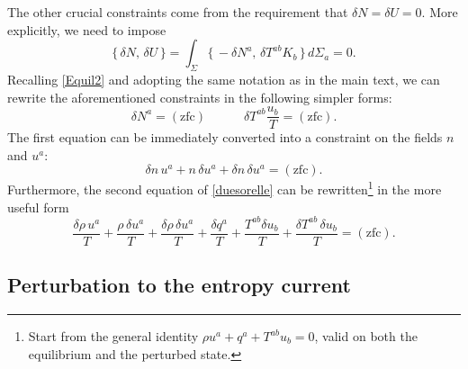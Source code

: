 \documentclass[a4paper, amsfonts, amssymb, amsmath, reprint, showkeys, nofootinbib, twoside, onecolumn,notitlepage]{revtex4-1}
\newcommand{\spc}{\quad \quad \quad}
\begin{document}
The other crucial constraints come from the requirement that $\delta N=\delta U=0$. More explicitly, we need to impose
\begin{equation}
\{ \, \delta N , \,  \delta U \, \} = \int_\Sigma \{ \, -\delta N^a, \, \delta T^{ab} K_b \, \} \, d\Sigma_a =0.
\end{equation}
Recalling \eqref{Equil2} and adopting the same notation as in the main text, we can rewrite the aforementioned constraints in the following simpler forms:
\begin{equation}\label{duesorelle}
\delta N^a =(\text{zfc})  \spc \delta T^{ab} \dfrac{u_b}{T} = (\text{zfc}).
\end{equation}
The first equation can be immediately converted into a constraint on the fields $n$ and $u^a$:
\begin{equation}\label{sorella1}
\delta n \, u^a + n \, \delta u^a + \delta n \, \delta u^a = (\text{zfc}).
\end{equation}
Furthermore, the second equation of \eqref{duesorelle} can be rewritten\footnote{Start from the general identity $\rho u^a + q^a +T^{ab} u_b=0$, valid on both the equilibrium and the perturbed state.} in the more useful form 
\begin{equation}\label{sorella2}
\dfrac{\delta \rho \, u^a}{T} + \dfrac{\rho \, \delta u^a}{T} + \dfrac{\delta \rho \, \delta u^a}{T} + \dfrac{\delta q^a}{T} +  \dfrac{T^{ab}\delta u_b}{T}  + \dfrac{\delta T^{ab} \, \delta u_b}{T} = (\text{zfc}).
\end{equation}


\subsection{Perturbation to the entropy current}
\end{document}
